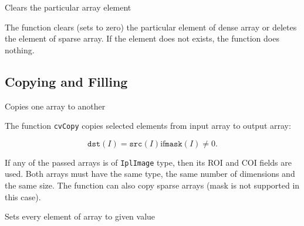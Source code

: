 \label{ClearND}

Clears the particular array element


\begin{description}
\end{description}


The function  clears (sets to zero) the particular element of dense array or deletes the element of sparse array. If the element does not exists, the function does nothing.


\subsection{Copying and Filling}


\label{Copy}

Copies one array to another


\begin{description}
\end{description}


The function \texttt{cvCopy} copies selected elements from input array to output array:

\[
\texttt{dst}(I)=\texttt{src}(I) \text{if} \texttt{mask}(I) \ne 0.
\]

If any of the passed arrays is of \texttt{IplImage} type, then its ROI
and COI fields are used. Both arrays must have the same type, the same
number of dimensions and the same size. The function can also copy sparse
arrays (mask is not supported in this case).

\label{Set}

Sets every element of array to given value


